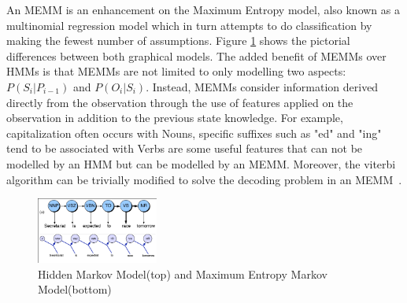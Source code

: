 \documentclass{acm_proc_article-sp}
\begin{document}
An MEMM is an enhancement on the Maximum Entropy model, also known as a multinomial regression model which in turn attempts to do classification by making the fewest number of assumptions. Figure \ref{hmmVmemm} shows the pictorial differences between both graphical models. The added benefit of MEMMs over HMMs is that MEMMs are not limited to only modelling two aspects: $P( S_i | P_{i-1} )$ and $P( O_i | S_i )$. Instead, MEMMs consider information derived directly from the observation through the use of features applied on the observation in addition to the previous state knowledge. For example, capitalization often occurs with Nouns, specific suffixes such as "ed" and "ing" tend to be associated with Verbs are some useful features that can not be modelled by an HMM but can be modelled by an MEMM. Moreover, the viterbi algorithm can be trivially modified to solve the decoding problem in an MEMM~\cite{nlpBook}.
\begin{figure}[ht!]
\centering
\includegraphics[width=40mm]{figures/memm.png}
\caption{Hidden Markov Model(top) and Maximum Entropy Markov Model(bottom)~\cite{nlpBook} \label{hmmVmemm}}
\end{figure}



\end{document}
